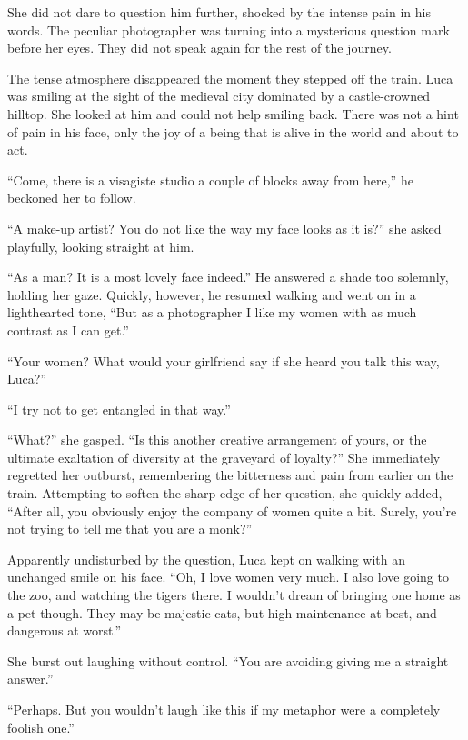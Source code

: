 She did not dare to question him further, shocked by the intense pain in his words. The peculiar photographer was turning into a mysterious question mark before her eyes. They did not speak again for the rest of the journey.

\sectionline

The tense atmosphere disappeared the moment they stepped off the train. Luca was smiling at the sight of the medieval city dominated by a castle-crowned hilltop. She looked at him and could not help smiling back. There was not a hint of pain in his face, only the joy of a being that is alive in the world and about to act.

``Come, there is a visagiste studio a couple of blocks away from here,'' he beckoned her to follow.

``A make-up artist? You do not like the way my face looks as it is?'' she asked playfully, looking straight at him.

``As a man? It is a most lovely face indeed.'' He answered a shade too solemnly, holding her gaze. Quickly, however, he resumed walking and went on in a lighthearted tone, ``But as a photographer I like my women with as much contrast as I can get.''

``Your women? What would your girlfriend say if she heard you talk this way, Luca?''

``I try not to get entangled in that way.''

``What?'' she gasped. ``Is this another creative arrangement of yours, or the ultimate exaltation of diversity at the graveyard of loyalty?'' She immediately regretted her outburst, remembering the bitterness and pain from earlier on the train. Attempting to soften the sharp edge of her question, she quickly added, ``After all, you obviously enjoy the company of women quite a bit. Surely, you're not trying to tell me that you are a monk?''

Apparently undisturbed by the question, Luca kept on walking with an unchanged smile on his face. ``Oh, I love women very much. I also love going to the zoo, and watching the tigers there. I wouldn't dream of bringing one home as a pet though. They may be majestic cats, but high-maintenance at best, and dangerous at worst.''

She burst out laughing without control. ``You are avoiding giving me a straight answer.''

``Perhaps. But you wouldn't laugh like this if my metaphor were a completely foolish one.''


